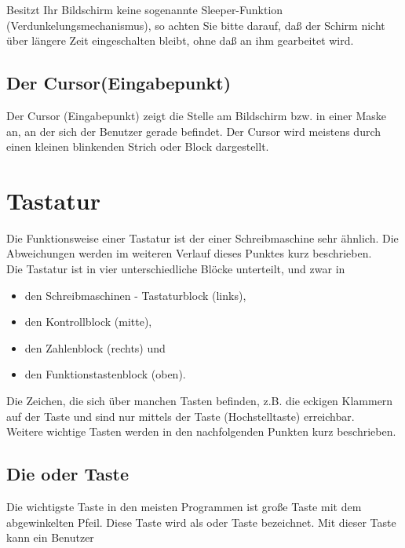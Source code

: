 Besitzt Ihr Bildschirm keine sogenannte Sleeper-Funktion
(Verdunkelungsmechanismus), so achten Sie bitte darauf, da{\ss} der
Schirm nicht \"{u}ber l\"{a}ngere Zeit eingeschalten bleibt, ohne
da{\ss} an ihm gearbeitet wird.

\subsection{Der Cursor(Eingabepunkt)}

Der Cursor (Eingabepunkt) zeigt die Stelle am Bildschirm bzw. in einer
Maske an, an der sich der Benutzer gerade befindet. Der Cursor wird
meistens durch einen kleinen blinkenden Strich oder Block dargestellt.

\section{Tastatur}

Die Funktionsweise einer Tastatur ist der einer Schreibmaschine sehr
\"{a}hnlich. Die Abweichungen werden im weiteren Verlauf dieses
Punktes kurz beschrieben.\\

Die Tastatur ist in vier unterschiedliche Bl\"{o}cke unterteilt, und zwar in

\begin{itemize}
\item den Schreibmaschinen - Tastaturblock (links),
\item den Kontrollblock (mitte),
\item den Zahlenblock (rechts) und
\item den Funktionstastenblock (oben).
\end{itemize}

Die Zeichen, die sich \"{u}ber manchen Tasten befinden, z.B. die eckigen
Klammern auf der Taste  und  sind nur mittels der Taste
 (Hochstelltaste) erreichbar.\\
Weitere wichtige Tasten werden in den nachfolgenden Punkten kurz beschrieben.


\subsection{Die \protect{} oder \protect{} Taste}

Die wichtigste Taste in den meisten Programmen ist gro{\ss}e Taste
mit dem abgewinkelten Pfeil. Diese Taste wird als  oder
 Taste bezeichnet. Mit dieser Taste kann ein Benutzer

